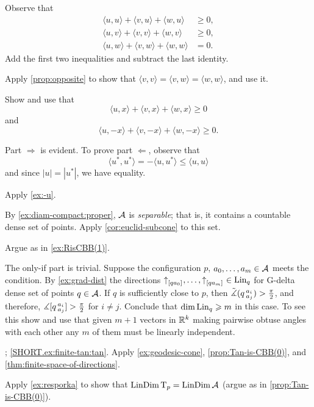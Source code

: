 Observe that
\begin{align*}
\langle u,u\rangle+\langle v,u\rangle+\langle w,u\rangle &\ge 0,
\\
\langle u,v\rangle+\langle v,v\rangle+\langle w,v\rangle &\ge 0,
\\
\langle u,w\rangle+\langle v,w\rangle+\langle w,w\rangle &= 0.
\end{align*}
Add the first two inequalities and subtract the last identity.

Apply \ref{prop:opposite} to show that 
$\langle v,v\rangle =\langle v,w\rangle=\langle w,w\rangle$,
and use it.

 Show and use that
\[\langle u,x\rangle +\langle v,x\rangle +\langle w,x\rangle \ge 0\]
and
\[\langle u,-x\rangle +\langle v,-x\rangle +\langle w,-x\rangle \ge 0.\]

 Part $\Rightarrow$ is evident.
To prove part $\Leftarrow$, observe that 
\[\langle u^*,u^*\rangle =-\langle u,u^*\rangle\le \langle u,u\rangle\]
and since $|u|=|u^*|$, we have equality.

Apply \ref{ex:-u}.

By \ref{ex:diam-compact:proper}, $\mathcal{A}$ is \emph{separable}; that is, it contains a countable dense set of points.
Apply \ref{cor:euclid-subcone} to this set.

 Argue as in \ref{ex:RisCBB(1)}.

 The only-if part is trivial.
Suppose the configuration $p$, $a_0,\dots, a_{m}\in \mathcal{A}$ meets the condition.
By \ref{ex:grad-dist} the directions ${\uparrow}_{[{q}{a_0}]_{{}}},\dots,{\uparrow}_{[{q}{a_m}]_{{}}}\in \mathop{\rm Lin}\nolimits_q$ for G-delta dense set of points $q\in \mathcal{A}$.
If $q$ is sufficiently close to $p$, then $\tilde\measuredangle(q\,{}^{a_i}_{a_j})>\tfrac\pi2$,
and therefore, $\measuredangle[q\,{}^{a_i}_{a_j}]>\tfrac\pi2$ for $i\ne j$.
Conclude that $\operatorname{\rm dim}\nolimits\mathop{\rm Lin}\nolimits_q\geqslant m$ in this case. To see this show and use that given $m+1$ vectors in $\mathbb{R}^k$ making pairwise obtuse angles with each other any $m$ of them must be linearly independent.

\parbf{\ref{ex:finite-tan}}; 
\ref{SHORT.ex:finite-tan:tan}. Apply \ref{ex:geodesic-cone}, \ref{prop:Tan-is-CBB(0)}, and \ref{thm:finite-space-of-directions}.

Apply \ref{ex:resporka} to show that $\mathop{\rm LinDim}\nolimits\mathrm{T}_p=\mathop{\rm LinDim}\nolimits\mathcal{A}$ (argue as in \ref{prop:Tan-is-CBB(0)}).

